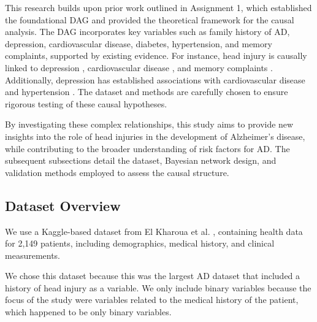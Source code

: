 \documentclass[12pt]{article}
\begin{document}
This research builds upon prior work outlined in Assignment 1, which established the foundational DAG and provided the theoretical framework for the causal analysis. The DAG incorporates key variables such as family history of AD, depression, cardiovascular disease, diabetes, hypertension, and memory complaints, supported by existing evidence. For instance, head injury is causally linked to depression \cite{jorge2004major}, cardiovascular disease \cite{stewart2022association}, and memory complaints \cite{izzy2023long}. Additionally, depression has established associations with cardiovascular disease \cite{khandaker2020shared} and hypertension \cite{inoue2024depressive}. The dataset and methods are carefully chosen to ensure rigorous testing of these causal hypotheses.

By investigating these complex relationships, this study aims to provide new insights into the role of head injuries in the development of Alzheimer's disease, while contributing to the broader understanding of risk factors for AD. The subsequent subsections detail the dataset, Bayesian network design, and validation methods employed to assess the causal structure. 

\subsection{Dataset Overview} We use a Kaggle-based dataset from El Kharoua et al. \cite{rabie_el_kharoua_2024}, containing health data for 2,149 patients, including demographics, medical history, and clinical measurements. 

We chose this dataset because this was the largest AD dataset that included a history of head injury as a variable. We only include binary variables because the focus of the study were variables related to the medical history of the patient, which happened to be only binary variables.
\end{document}
